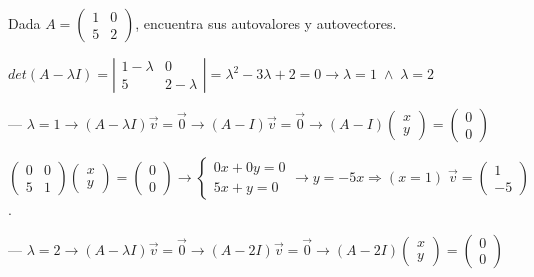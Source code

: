 \begin{cuadro-gris}
Dada $A=\left( \begin{matrix} 1&0\\5&2 \end{matrix} \right)$, encuentra sus autovalores y autovectores.

$det(A-\lambda I)=\left| \begin{matrix} 1-\lambda&0\\5&2-\lambda \end{matrix} \right|=\lambda^2-3\lambda+2=0 \longrightarrow \lambda =1 \; \wedge \; \lambda=2$

--- $\lambda =1 \longrightarrow (A-\lambda I)\vec v=\vec 0 \to (A-I)\vec v=\vec 0\to (A-I)\left( \begin{matrix} x\\y \end{matrix} \right) = \left( \begin{matrix} 0\\0 \end{matrix} \right)$ 

\noindent \small{$\left( \begin{matrix} 0&0\\5&1 \end{matrix} \right)\left( \begin{matrix} x\\y \end{matrix} \right) = \left( \begin{matrix} 0\\0 \end{matrix} \right) \to \begin{cases} 0x+0y=0\\5x+y=0 \end{cases} \to y=-5x \Rightarrow (x=1)\; 
\vec v=\left( \begin{matrix} 1\\-5 \end{matrix} \right)$}\normalsize{.}


--- $\lambda =2 \longrightarrow (A-\lambda I)\vec v=\vec 0 \to (A-2I)\vec v=\vec 0\to (A-2I)\left( \begin{matrix} x\\y \end{matrix} \right) = \left( \begin{matrix} 0\\0 \end{matrix} \right)$	


\end{cuadro-gris}
